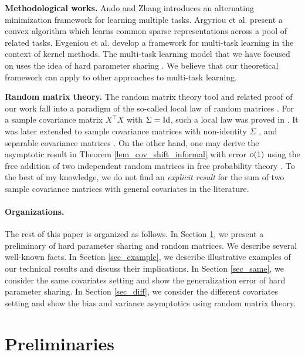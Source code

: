 \medskip
\noindent\textbf{Methodological works.}
Ando and Zhang \cite{AZ05} introduces an alternating minimization framework for learning multiple tasks.
Argyriou et al. \cite{AEP08} present a convex algorithm which learns common sparse representations across a pool of related tasks.
Evgeniou et al. \cite{EMP05} develop a framework for multi-task learning in the context of kernel methods.
The multi-task learning model that we have focused on uses the idea of hard parameter sharing \cite{C93,KD12,R17}.
We believe that our theoretical framework can apply to other approaches to multi-task learning.

\medskip
\noindent\textbf{Random matrix theory.}
The random matrix theory tool and related proof of our work fall into a paradigm of the so-called local law of random matrices \cite{erdos2017dynamical}.
For a sample covariance matrix $X^\top X$ with $\Sigma=\operatorname{Id}$, such a local law was proved in \cite{isotropic}.
It was later extended to sample covariance matrices with non-identity $\Sigma$ \cite{Anisotropic}, and separable covariance matrices \cite{yang2019spiked}. On the other hand, one may derive the asymptotic result in Theorem \ref{lem_cov_shift_informal} with error $\operatorname{o}(1)$ using the free addition of two independent random matrices in free probability theory \cite{nica2006lectures}. To the best of my knowledge, we do not find an {\it explicit result} for the sum of two sample covariance matrices with general covariates in the literature.



\paragraph{Organizations.}
The rest of this paper is organized as follows.
In Section \ref{sec_prelim}, we present a preliminary of hard parameter sharing and random matrices. We describe several well-known facts.
In Section \ref{sec_example}, we describe illustrative examples of our technical results and discuss their implications.
In Section \ref{sec_same}, we consider the same covariates setting and show the generalization error of hard parameter sharing.
In Section \ref{sec_diff}, we consider the different covariates setting and show the bias and variance asymptotics using random matrix theory.


\section{Preliminaries}\label{sec_prelim}


